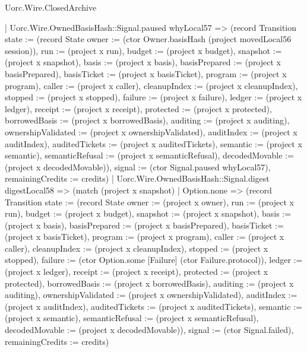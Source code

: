 \begin{lexlean}{Uorc.Wire.ClosedArchive}
\begin{semanticmodule}
{      | Uorc.Wire.OwnedBasisHash::Signal.paused whyLocal57 => (record Transition {state := (record State {owner := (ctor Owner.basisHash (project movedLocal56 session)), run := (project x run), budget := (project x budget), snapshot := (project x snapshot), basis := (project x basis), basisPrepared := (project x basisPrepared), basisTicket := (project x basisTicket), program := (project x program), caller := (project x caller), cleanupIndex := (project x cleanupIndex), stopped := (project x stopped), failure := (project x failure), ledger := (project x ledger), receipt := (project x receipt), protected := (project x protected), borrowedBasis := (project x borrowedBasis), auditing := (project x auditing), ownershipValidated := (project x ownershipValidated), auditIndex := (project x auditIndex), auditedTickets := (project x auditedTickets), semantic := (project x semantic), semanticRefusal := (project x semanticRefusal), decodedMovable := (project x decodedMovable)}), signal := (ctor Signal.paused whyLocal57), remainingCredits := credits})
      | Uorc.Wire.OwnedBasisHash::Signal.digest digestLocal58 => (match (project x snapshot)
        | Option.none => (record Transition {state := (record State {owner := (project x owner), run := (project x run), budget := (project x budget), snapshot := (project x snapshot), basis := (project x basis), basisPrepared := (project x basisPrepared), basisTicket := (project x basisTicket), program := (project x program), caller := (project x caller), cleanupIndex := (project x cleanupIndex), stopped := (project x stopped), failure := (ctor Option.some [Failure] (ctor Failure.protocol)), ledger := (project x ledger), receipt := (project x receipt), protected := (project x protected), borrowedBasis := (project x borrowedBasis), auditing := (project x auditing), ownershipValidated := (project x ownershipValidated), auditIndex := (project x auditIndex), auditedTickets := (project x auditedTickets), semantic := (project x semantic), semanticRefusal := (project x semanticRefusal), decodedMovable := (project x decodedMovable)}), signal := (ctor Signal.failed), remainingCredits := credits})
}
\end{semanticmodule}
\end{lexlean}

